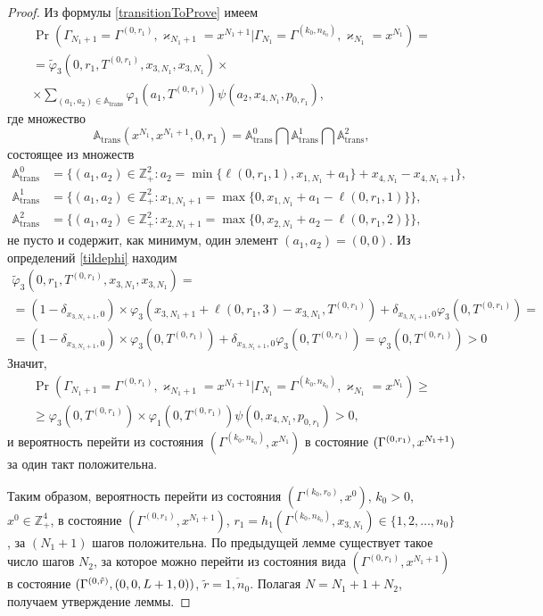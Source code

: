 \documentclass[a4paper,12pt,russian]{extarticle}
\begin{document}
\begin{proof}
Из формулы \eqref{transitionToProve} имеем
\begin{multline*}
\Pr (\Gamma_{N_1+1}=\Gamma^{(0,r_1)},\varkappa_{N_1+1}=x^{N_1+1} | \Gamma_{N_1}=\Gamma^{(k_0,n_{k_0})},\varkappa_{N_1}=x^{N_1})=\\
=\widetilde{\varphi}_3(0,r_1,T^{(0,r_1)},x_{3,N_1},x_{3,N_1})\times \\
\times
\sum_{(a_1,a_2)\in {\mathbb A}_{\mathrm{trans}}}\varphi_1(a_1,T^{(0,r_1)})  \psi(a_2,x_{4,N_1}, p_{0,r_1}),
\end{multline*}
где множество 
\begin{equation*}
{\mathbb A}_{\mathrm{trans}}(x^{N_1},x^{N_1+1},0,r_1) = {\mathbb A}_{\mathrm{trans}}^0 \bigcap {\mathbb A}_{\mathrm{trans}}^1\bigcap {\mathbb A}_{\mathrm{trans}}^2,
\end{equation*}
состоящее из множеств 
\begin{align*}
{\mathbb A}_{\mathrm{trans}}^0 &= \{(a_1,a_2) \in \mathbb{Z}_+^2 \colon a_2 = \min{\{\ell(0,r_1,1), x_{1,N_1}+a_1}\} +x_{4,N_1}-x_{4,N_1+1} \}, \\
{\mathbb A}_{\mathrm{trans}}^1 &= \{(a_1,a_2) \in \mathbb{Z}_+^2 \colon x_{1,N_1+1} =\max{\{0,x_{1,N_1}+a_1-\ell(0,r_1,1)\}}\},\\
 {\mathbb A}_{\mathrm{trans}}^2 &= \{(a_1,a_2) \in \mathbb{Z}_+^2 \colon  x_{2,N_1+1}=\max{\{0,x_{2,N_1}+a_2-\ell(0,r_1,2)\}}\},
\end{align*}
не пусто и содержит, как минимум, один элемент $(a_1,a_2)=(0,0)$. Из определений \eqref{tildephi} находим
\begin{multline*}
\widetilde{\varphi}_3(0,r_1,T^{(0,r_1)},x_{3,N_1},x_{3,N_1})=\\=(1-\delta_{x_{3,N_1+1},0}) \times\varphi_3(x_{3,N_1+1} + \ell (0,r_1,3) - x_{3,N_1},T^{(0,r_1)} )
+\delta_{x_{3,N_1+1},0} \varphi_3 (0,T^{(0,r_1)}) = \\=
(1-\delta_{x_{3,N_1+1},0}) \times\varphi_3(0,T^{(0,r_1)} )
+\delta_{x_{3,N_1+1},0} \varphi_3 (0,T^{(0,r_1)}) = \varphi_3 (0,T^{(0,r_1)})> 0
\end{multline*}
Значит,
\begin{multline*}
\Pr (\Gamma_{N_1+1}=\Gamma^{(0,r_1)},\varkappa_{N_1+1}=x^{N_1+1} | \Gamma_{N_1}=\Gamma^{(k_0,n_{k_0})},\varkappa_{N_1}=x^{N_1})\geqslant\\
\geqslant\varphi_3 (0,T^{(0,r_1)})
\times
\varphi_1(0,T^{(0,r_1)})  \psi(0,x_{4,N_1}, p_{0,r_1}) > 0,
\end{multline*}
и вероятность перейти из состояния $(\Gamma^{(k_0,n_{k_0})}, x^{N_1})$ в состояние $ (\Gamma^{(0,r_1)}, \hm{} x^{N_1+1})$ за один такт положительна.

Таким образом, вероятность перейти из состояния $(\Gamma^{(k_0,r_0)},x^0)$, $k_0>0$, $x^0 \in \mathbb{Z}_+^4$, в состояние $(\Gamma^{(0,r_1)},x^{N_1+1})$, $r_1=h_1(\Gamma^{(k_0,n_{k_0})},x_{3,N_1}) \in \{1, 2, \ldots, n_0\}$,
за $(N_1+1)$ шагов положительна. По предыдущей лемме существует такое число шагов $N_2$, за которое можно перейти из состояния вида $(\Gamma^{(0,r_1)},x^{N_1+1})$ в состояние $(\Gamma^{(0,\tilde{r})},(0,0,L\hm+1,0))$, $\tilde{r}=\overline{1,n_0}$. Полагая $N=N_1+1+N_2$, получаем утверждение леммы.
\end{proof}
\end{document}
